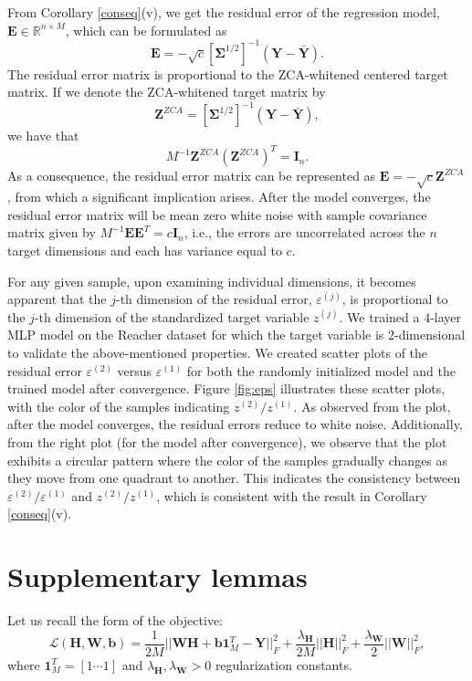 \documentclass{article}
\theoremstyle{plain}
\theoremstyle{definition}
\theoremstyle{remark}
\newcommand{\bW}{{\mathbf W}}
\newcommand{\bY}{{\mathbf Y}}
\newcommand{\bH}{{\mathbf H}}
\newcommand{\bI}{{\mathbf I}}
\newcommand{\bYb}{{\bar{\mathbf Y}}}
\newcommand{\bb}{{\mathbf b}}
\newcommand{\bSigma}{{\mathbf \Sigma}}
\newcommand{\lH}{\lambda_{\bH}}
\newcommand{\lW}{\lambda_{\bW}}
\begin{document}
From Corollary \ref{conseq}(v), 
we get the residual error of the regression model, $\mathbf{E} \in \mathbb{R}^{n \times M}$, which can be formulated as 
\[
\mathbf{E}=-\sqrt{c} [\bSigma^{1/2}]^{-1} (\bY-\bYb).
\]
The residual error matrix is proportional to the ZCA-whitened centered target matrix. If we denote the ZCA-whitened target matrix by 
\[
\mathbf{Z}^{ZCA} = [\bSigma^{1/2}]^{-1} (\bY-\bYb),
\]
we have that 
\[
M^{-1} \mathbf{Z}^{ZCA} (\mathbf{Z}^{ZCA})^T=\bI_n.
\]
As a consequence, the residual error matrix can be represented as $\mathbf{E}=-\sqrt{c} \mathbf{Z}^{ZCA}$, from which a significant implication arises. After the model converges, the residual error matrix will be mean zero white noise with sample covariance matrix given by $M^{-1}\mathbf{E}\mathbf{E}^T=c \bI_n$,  i.e., the errors are uncorrelated across the $n$ target dimensions and each has variance equal to $c$. 

For any given sample,  upon examining individual dimensions, it becomes apparent that the  $j$-th dimension of the residual error, $\varepsilon^{(j)}$, is proportional to the $j$-th dimension of the standardized target variable ${z}^{(j)}$.   
We trained a 4-layer MLP model on the Reacher dataset for which the target variable is 2-dimensional to validate the above-mentioned properties. We created scatter plots of the residual error $\varepsilon^{(2)}$ versus $\varepsilon^{(1)}$ for both the randomly initialized model and the trained model after convergence. Figure \ref{fig:eps} illustrates these scatter plots, with the color of the samples indicating ${z}^{(2)}/{z}^{(1)}$. As observed from the plot, after the model converges, the residual errors reduce to white noise. Additionally, from the right plot (for the model after convergence), we observe that the plot exhibits a circular pattern where the color of the samples gradually changes as they move from one quadrant to another. This indicates the consistency between $\varepsilon^{(2)}/\varepsilon^{(1)}$ and ${z}^{(2)}/{z}^{(1)}$, which is consistent with the result in Corollary \ref{conseq}(v). 

\clearpage
\section{Supplementary lemmas}
\label{sec:c_exp}
Let us recall the form of the objective:
\begin{equation} \label{formoflossnew}
\mathcal{L}(\bH, \bW, \bb)=\frac{1}{2M} ||\bW \bH + \bb \mathbf{1}_M^{T} - \bY||_F^2 + \frac{\lH}{2M} ||\bH||_{F}^2 + \frac{\lW}{2} ||\bW||_F^2,
\end{equation}
where $\mathbf{1}_M^T=[1\cdots 1]$ and $\lH, \lW>0$  regularization constants.
\end{document}
